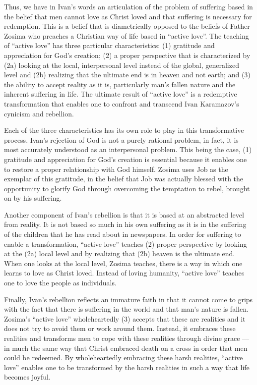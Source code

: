 Thus, we have in Ivan's words an articulation of the problem of suffering based in the belief that men cannot love as Christ loved and that suffering is necessary for redemption. This is a belief that is diametrically opposed to the beliefs of Father Zosima who preaches a Christian way of life based in ``active love''. The teaching of ``active love'' has three particular characteristics: (1) gratitude and appreciation for God's creation; (2) a proper perspective that is characterized by (2a) looking at the local, interpersonal level instead of the global, generalized level and (2b) realizing that the ultimate end is in heaven and not earth; and (3) the ability to accept reality as it is, particularly man's fallen nature and the inherent suffering in life. The ultimate result of ``active love'' is a redemptive transformation that enables one to confront and transcend Ivan Karamazov's cynicism and rebellion. 

Each of the three characteristics has its own role to play in this transformative process. Ivan's rejection of God is not a purely rational problem, in fact, it is most accurately understood as an interpersonal problem. This being the case, (1) gratitude and appreciation for God's creation is essential because it enables one to restore a proper relationship with God himself. Zosima uses Job as the exemplar of this gratitude, in the belief that Job was actually blessed with the opportunity to glorify God through overcoming the temptation to rebel, brought on by his suffering. 

Another component of Ivan's rebellion is that it is based at an abstracted level from reality. It is not based so much in his own suffering as it is in the suffering of the children that he has read about in newspapers. In order for suffering to enable a transformation, ``active love'' teaches (2) proper perspective by looking at the (2a) local level and by realizing that (2b) heaven is the ultimate end. When one looks at the local level, Zosima teaches, there is a way in which one learns to love as Christ loved. Instead of loving humanity, ``active love'' teaches one to love the people as individuals. 

Finally, Ivan's rebellion reflects an immature faith in that it cannot come to grips with the fact that there is suffering in the world and that man's nature is fallen. Zosima's ``active love'' wholeheartedly (3) accepts that these are realities and it does not try to avoid them or work around them. Instead, it embraces these realities and transforms men to cope with these realities through divine grace --- in much the same way that Christ embraced death on a cross in order that men could be redeemed. By wholeheartedly embracing these harsh realities, ``active love'' enables one to be transformed by the harsh realities in such a way that life becomes joyful.

